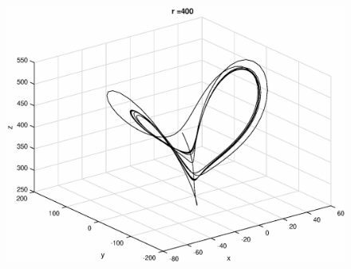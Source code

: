 \begin{figure}[!htb]
\begin{minipage}{0.4\textwidth}
\end{minipage}
\begin{minipage}{0.4\textwidth}
\includegraphics[width = \textwidth]{r=400.eps}
\end{minipage}
\end{figure}
